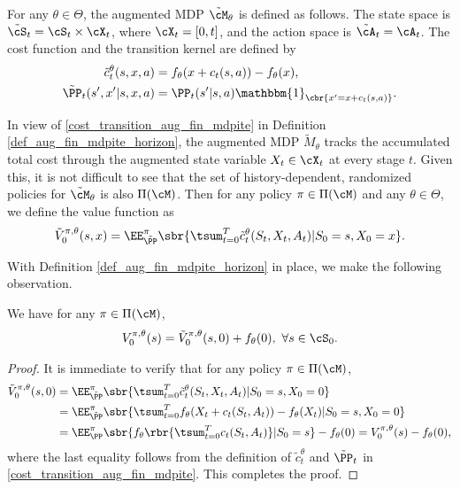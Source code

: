 \documentclass[9pt]{article}
\numberwithin{equation}{section}
\begin{document}
\begin{definition}\label{def_aug_fin_mdpite_horizon}
    For any $\theta \in \Theta$, the augmented MDP $\tilde{\cM}_\theta$ is defined as follows. 
    The state space is $\tilde{\cS}_t = \cS_t \times \cX_t$, where $\cX_t = [0,t]$, and the action space is $\tilde{\cA}_t = \cA_t$.
    The cost function and the transition kernel are defined by 
\begin{align}\label{cost_transition_aug_fin_mdpite}
\tilde{c}_t^\theta(s,x,a)
&= f_\theta ({x+c_t(s,a)})- f_\theta(x), \nonumber \\
\tilde{\PP}_t(s',x' |  s,x,a)
&= \PP_t(s' |  s,a) \mathbbm{1}_{\cbr{x'=x+c_t(s,a)}}.
\end{align}
\end{definition}

In view of \eqref{cost_transition_aug_fin_mdpite} in Definition \ref{def_aug_fin_mdpite_horizon}, the augmented MDP $\tilde{M}_\theta$ tracks the accumulated total cost through the augmented state variable $X_t \in \cX_t$ at every stage $t$.
Given this, it is not difficult to see that the  set of history-dependent, randomized policies for $\tilde{\cM}_\theta$ is also $\Pi(\cM)$.
Then for any policy $\pi \in \Pi(\cM)$ and any $\theta \in \Theta$, we define the value function  as
\begin{align}\label{eq_value_given_pi_aug_mdp}
    \tilde{V}^{\pi, \theta}_0(s, x) = 
    \EE^{\pi}_{\tilde{\PP}} \sbr{
    \tsum_{t=0}^T \tilde{c}_t^\theta(S_t, X_t, A_t)
    | S_0 = s, X_0 = x
    }.
\end{align}


With Definition \ref{def_aug_fin_mdpite_horizon} in place, we make the following  observation. 

\begin{proposition}\label{prop_reform_fin_mdpite}
    We have for any $\pi \in \Pi(\cM)$,
    \begin{align*}
         V^{\pi,\theta}_0(s) =  \tilde{V}^{\pi, \theta}_0(s, 0) + f_\theta(0), ~ \forall s \in \cS_0.
    \end{align*}
\end{proposition}

\begin{proof}
    It is immediate to verify that 
    for any policy $\pi \in \Pi(\cM)$,
    \begin{align*}
         \tilde{V}^{{\pi}, \theta}_0(s, 0) 
         & =
         \EE^{{\pi}}_{\tilde{\PP}} \sbr{
    \tsum_{t=0}^T \tilde{c}_t^\theta(S_t, X_t, A_t) | S_0 = s, X_0 = 0
    }  \\
    & = 
     \EE^{{\pi}}_{\tilde{\PP}} \sbr{
    \tsum_{t=0}^T 
    f_\theta ({X_t+c_t(S_t,A_t)})-f_\theta(X_t) | S_0 = s, X_0 = 0
    } \\
    & = \EE^{{\pi}}_{{\PP}}
    \sbr{f_\theta \rbr{\tsum_{t=0}^T c_t (S_t, A_t)} | S_0 = s}
    - f_\theta(0)
         = V^{\pi,\theta}_0(s) - f_\theta(0),
    \end{align*}
where the last equality follows from the definition of $\tilde{c}_t^\theta$ and $\tilde{\PP}_t$ in \eqref{cost_transition_aug_fin_mdpite}. This completes the proof.
\end{proof}
\end{document}
